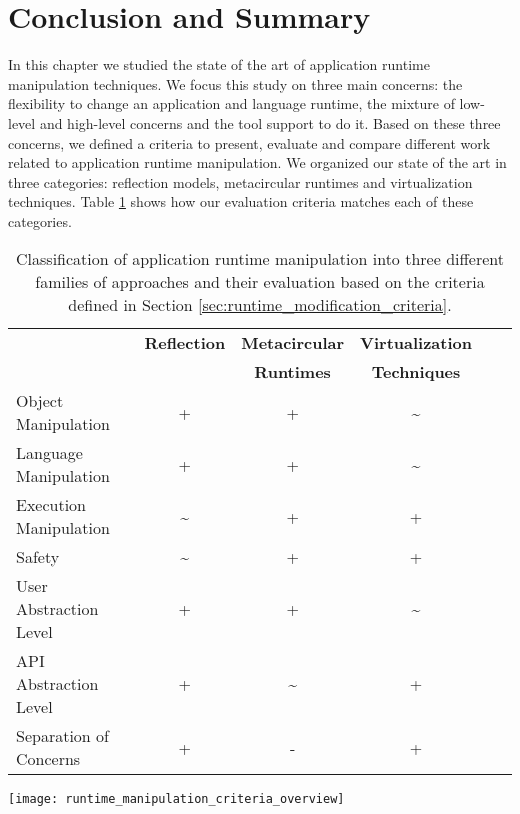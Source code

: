 \section{Conclusion and Summary}

In this chapter we studied the state of the art of application runtime manipulation techniques. We focus this study on three main concerns: the flexibility to change an application and language runtime, the mixture of low-level and high-level concerns and the tool support to do it. Based on these three concerns, we defined a criteria to present, evaluate and compare different work related to application runtime manipulation. We organized our state of the art in three categories: reflection models, metacircular runtimes and virtualization techniques. Table \ref{tb:comparison_runtime_manipulation} shows how our evaluation criteria matches each of these categories.

\begin{table}[ht]
 \small
 	\centering
 	\begin{tabular}{lccccc}
	
\toprule
 			& \textbf{Reflection}
 			& \textbf{Metacircular}
			& \textbf{Virtualization}\\
 			& \textbf{}
 			& \textbf{Runtimes}
			& \textbf{Techniques}\\
 \toprule

		Object Manipulation
 			& + & + & \textasciitilde \\
		\hline
		Language
		Manipulation
 			& + & + & \textasciitilde\\
		\hline
		Execution Manipulation
 			& \textasciitilde & + & + \\
		\hline
		Safety
 			& \textasciitilde & + & + \\
		\hline
		User Abstraction
		Level
 			& + & + & \textasciitilde \\
		\hline
		API Abstraction
		Level
 			& + & \textasciitilde & + \\
		\hline
		Separation of Concerns
 			& + & - & +\\
 	 \bottomrule
 	\end{tabular}
	\texttt{[image: runtime\_manipulation\_criteria\_overview]}
 	\caption{Classification of application runtime manipulation into three different families of approaches and their evaluation based on the criteria defined in Section \ref{sec:runtime_modification_criteria}.}
 	\label{tb:comparison_runtime_manipulation}
 \end{table}


